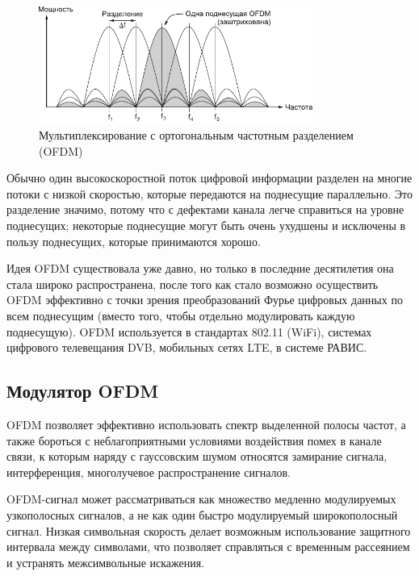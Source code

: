 \begin{figure}[H]
\centering
\includegraphics[width = 0.8\textwidth]{ofdm.pdf}
\caption{Мультиплексирование с ортогональным частотным разделением (OFDM)}
\label{ofdm}
\end{figure}

Обычно один высокоскоростной поток цифровой информации разделен на многие потоки с низкой скоростью, которые передаются на поднесущие параллельно.
Это разделение значимо, потому что с дефектами канала легче справиться на уровне поднесущих; некоторые поднесущие могут быть очень ухудшены и исключены в пользу поднесущих, которые принимаются хорошо.

Идея OFDM существовала уже давно, но только в последние десятилетия она стала широко распространена, после того как стало возможно осуществить OFDM эффективно с точки зрения преобразований Фурье цифровых данных по всем поднесущим (вместо того, чтобы отдельно модулировать каждую поднесущую).
OFDM используется в стандартах 802.11 (WiFi), системах цифрового телевещания DVB, мобильных сетях LTE, в системе РАВИС.


\subsection{Модулятор OFDM}

OFDM позволяет эффективно использовать спектр выделенной полосы частот, а также бороться с неблагоприятными условиями воздействия помех в канале связи, к которым наряду с гауссовским шумом относятся замирание сигнала, интерференция, многолучевое распространение сигналов.

OFDM-сигнал может рассматриваться как множество медленно модулируемых узкополосных сигналов, а не как один быстро модулируемый широкополосный сигнал.
Низкая символьная скорость делает возможным использование защитного интервала между символами, что позволяет справляться с временным рассеянием и устранять межсимвольные искажения.

